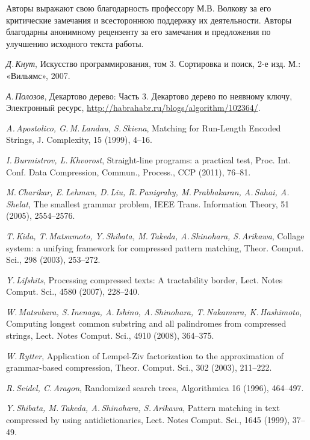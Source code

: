 ﻿\documentclass[11pt]{article}
\theoremstyle{remark}
\begin{document}
\bigskip

Авторы выражают свою благодарность профессору М.В. Волкову за его критические замечания и всестороннюю поддержку
их деятельности. Авторы благодарны анонимному рецензенту за его замечания и предложения по улучшению исходного текста
работы.

\small

\begin{thebibliography}{99}
\textsl{Д.\,Кнут}, Искусство программирования, том 3. Сортировка и поиск, 2-е изд. М.: «Вильямс», 2007.

\textsl{А.\,Полозов}, Декартово дерево: Часть 3. Декартово дерево по неявному ключу, Электронный ресурс,
\url{http://habrahabr.ru/blogs/algorithm/102364/}.

\textsl{A.\,Apostolico, G.\,M.\,Landau, S.\,Skiena}, Matching for Run-Length Encoded Strings, J. Complexity, 15 (1999),
4--16.

\textsl{I.\,Burmistrov, L.\,Khvorost}, Straight-line programs: a practical test, Proc. Int. Conf. Data Compression, Commun., Process., CCP
(2011), 76--81.

\textsl{M.\,Charikar, E.\,Lehman,  D.\,Liu, R.\,Panigrahy, M.\,Prabhakaran, A.\,Sahai, A.\,Shelat}, The smallest grammar problem, IEEE
Trans. Information Theory, 51 (2005), 2554--2576.

\textsl{T.\,Kida, T.\,Matsumoto, Y.\,Shibata, M.\,Takeda, A.\,Shinohara, S.\,Arikawa}, Collage system: a unifying
framework for compressed pattern matching, Theor. Comput. Sci., 298 (2003), 253--272.

\textsl{Y.\,Lifshits}, Processing compressed texts: A tractability border, Lect. Notes Comput. Sci., 4580 (2007), 228--240.

\textsl{W.\,Matsubara, S.\,Inenaga, A.\,Ishino, A.\,Shinohara, T.\,Nakamura, K.\,Hashimoto}, Computing longest common
substring and all palindromes from compressed strings, Lect. Notes Comput. Sci., 4910 (2008), 364--375.

\textsl{W.\,Rytter}, Application of {L}empel-{Z}iv factorization to the approximation of grammar-based compression,
Theor. Comput. Sci., 302 (2003), 211--222.

\textsl{R.\,Seidel, C.\,Aragon}, Randomized search trees, Algorithmica 16 (1996), 464--497.

\textsl{Y.\,Shibata, M.\,Takeda, A.\,Shinohara, S.\,Arikawa}, Pattern matching in text compressed by using
antidictionaries, Lect. Notes Comput. Sci., 1645 (1999), 37--49.


\end{thebibliography}
\end{document}
